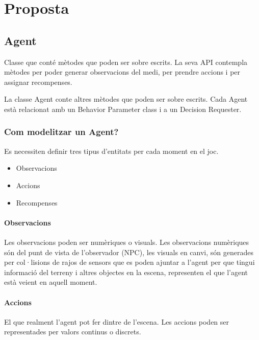 \documentclass{article}
\begin{document}
    \newpage
    
    \section{Proposta}
    
    \subsection{Agent}
    Classe que conté mètodes que poden ser sobre escrits. La seva API contempla mètodes per poder generar observacions del medi, per prendre accions i per assignar recompenses.

    La classe Agent conte altres mètodes que poden ser sobre escrits. Cada Agent està relacionat amb un Behavior Parameter class i a un Decision Requester.
    
    \subsubsection{Com modelitzar un Agent?}
    Es necessiten definir tres tipus d’entitats per cada moment en el joc.
    
    \begin{itemize}
        \item Observacions
        \item Accions
        \item Recompenses
    \end{itemize}
    
    \paragraph{Observacions}
    
    Les observacions poden ser numèriques o visuals. Les observacions numèriques són del punt de vista de l'observador (NPC), les visuals en canvi, són generades per col·lisions de rajos de sensors que es poden ajuntar a l'agent per que tingui informació del terreny i altres objectes en la escena, representen el que l'agent està veient en aquell moment.
    
    \paragraph{Accions}
    
    El que realment l'agent pot fer dintre de l'escena. Les accions poden ser representades per valors continus o discrets.
    
\end{document}

